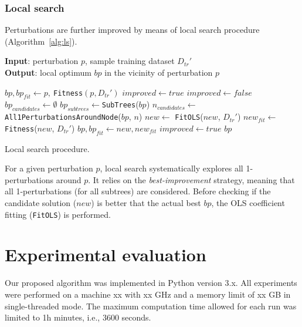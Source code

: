\documentclass[a4paper,12pt]{elsarticle}
\begin{document}
\subsubsection{Local search}\label{sec:ls}

Perturbations are further improved by means of local search procedure (Algorithm~\ref{alg:ls}). 

\begin{algorithm}
	\hspace*{\algorithmicindent} \textbf{Input}: perturbation $p$, sample training dataset $D_{tr}'$ \\
	\hspace*{\algorithmicindent} \textbf{Output}: local optimum $bp$ in the vicinity of perturbation $p$
	\begin{algorithmic}[1] 
		\State $bp, bp_{fit} \gets p,\ $\texttt{Fitness}$(p,D_{tr}')$ 
		\State $improved \gets true$
			\State $improved \gets false$
			\State $bp_{candidates} \gets \emptyset$
			\State $bp_{subtrees} \gets $\texttt{SubTrees}($bp$)
				\State $n_{candidates} \gets $ \texttt{All1PerturbationsAroundNode}($bp$, $n$)
					\State $new \gets$ \texttt{FitOLS}($new$, $D_{tr}'$)
					\State $new_{fit} \gets$ \texttt{Fitness}($new$, $D_{tr}'$)
						\State $bp, bp_{fit} \gets new, new_{fit}$
						\State $improved \gets true$
					\EndIf
				\EndFor
			\EndFor
		\EndWhile
		\State \Return $bp$
		\EndProcedure
	\end{algorithmic}
	\caption{Local search procedure.}
	\label{alg:ls}
\end{algorithm}  

For a given perturbation $p$, local search systematically explores all 1-perturbations around $p$. It relies on the \emph{best-improvement} strategy, meaning that all 1-perturbations (for all subtrees) are considered. Before checking if the candidate solution ($new$) is better that the actual best $bp$, the OLS coefficient fitting (\texttt{FitOLS}) is performed. 
   
\section{Experimental evaluation}\label{sec:experiments}

Our proposed algorithm was implemented in Python version 3.x. All experiments were performed on a machine xx with xx GHz and a memory limit of xx GB in single-threaded mode. The maximum computation time allowed for each run was limited to 1h minutes, i.e., 3600 seconds.
 
\end{document}
